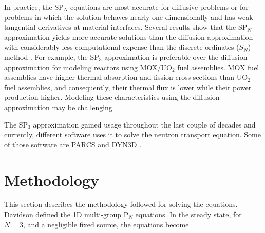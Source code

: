 \documentclass{anstrans}
\begin{document}
In practice, the SP$_N$ equations are most accurate for diffusive problems or for problems in which the solution behaves nearly one-dimensionally and has weak tangential derivatives at material interfaces.
Several results show that the SP$_N$ approximation yields more accurate solutions than the diffusion approximation \cite{mui_modified_1987} \cite{beckert_development_2007} \cite{ryu_finite_2013} with considerably less computational expense than the discrete ordinates ($S_N$) method \cite{brantley_simplifiedP3_2000}.
For example, the SP$_3$ approximation is preferable over the diffusion approximation for modeling reactors using MOX/UO$_2$ fuel assemblies.
MOX fuel assemblies have higher thermal absorption and fission cross-sections than UO$_2$ fuel assemblies, and consequently, their thermal flux is lower while their power production higher.
Modeling these characteristics using the diffusion approximation may be challenging \cite{brantley_simplifiedP3_2000} \cite{capilla_applications_2009}.

The SP$_3$ approximation gained usage throughout the last couple of decades and currently, different software uses it to solve the neutron transport equation.
Some of those software are PARCS \cite{downar_parcs_2004} and DYN3D \cite{beckert_development_2007}.

\section{Methodology}

This section describes the methodology followed for solving the equations.
Davidson \cite{davidson_neutron_1957} defined the 1D multi-group P$_N$ equations.
In the steady state, for $N=3$, and a negligible fixed source, the equations become
\end{document}
